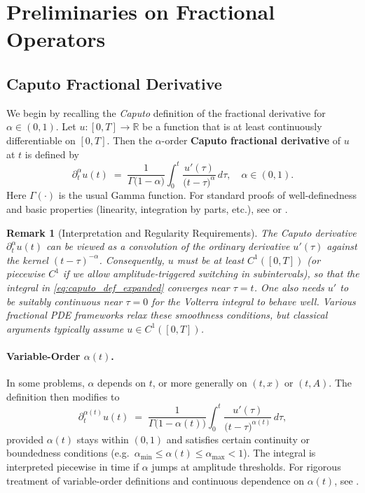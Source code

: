 \documentclass[12pt]{article}
\newtheorem{remark}[theorem]{Remark}
\begin{document}
\section{Preliminaries on Fractional Operators}

\subsection{Caputo Fractional Derivative}
\label{subsec:caputo}

We begin by recalling the \emph{Caputo} definition of the fractional derivative for
\(\alpha\in(0,1)\). Let \(u \colon [0,T]\to \mathbb{R}\) be a function that is at least
continuously differentiable on \([0,T]\). Then the \(\alpha\)-order \textbf{Caputo
fractional derivative} of \(u\) at \(t\) is defined by
\begin{equation}
\label{eq:caputo_def_expanded}
\partial_t^\alpha u(t)
\;=\;
\frac{1}{\Gamma\bigl(1-\alpha\bigr)}
\int_{0}^{t}
  \frac{u'(\tau)}{\bigl(t-\tau\bigr)^{\alpha}}
\,d\tau,
\quad
\alpha\in(0,1).
\end{equation}
Here \(\Gamma(\cdot)\) is the usual Gamma function. For standard proofs of well-definedness
and basic properties (linearity, integration by parts, etc.), see
\cite[Chapter~2]{Diethelm2010} or \cite[Section~2.4]{Kilbas2006}.

\begin{remark}[Interpretation and Regularity Requirements]
The Caputo derivative \(\partial_t^\alpha u(t)\) can be viewed as a \emph{convolution} of
the ordinary derivative \(u'(\tau)\) against the kernel \((t-\tau)^{-\alpha}\). Consequently,
\(u\) must be at least \(C^1([0,T])\) (or piecewise \(C^1\) if we allow amplitude-triggered
switching in subintervals), so that the integral in \eqref{eq:caputo_def_expanded} converges
near \(\tau=t\). One also needs \(u'\) to be suitably continuous near \(\tau=0\) for the
Volterra integral to behave well. Various fractional PDE frameworks relax these smoothness
conditions, but classical arguments typically assume \(u\in C^1([0,T])\).
\end{remark}

\paragraph{Variable-Order \(\alpha(t)\).}
In some problems, \(\alpha\) depends on \(t\), or more generally on \((t,x)\) or \((t,A)\).
The definition then modifies to
\[
\partial_t^{\alpha(t)} u(t)
\;=\;
\frac{1}{\Gamma\bigl(1-\alpha(t)\bigr)}
\int_0^t
  \frac{u'(\tau)}{\bigl(t-\tau\bigr)^{\alpha(t)}}
\,d\tau,
\]
provided \(\alpha(t)\) stays within \((0,1)\) and satisfies certain continuity or boundedness
conditions (e.g.\ \(\alpha_{\min}\le\alpha(t)\le\alpha_{\max}<1\)). The integral is
interpreted piecewise in time if \(\alpha\) jumps at amplitude thresholds. For rigorous
treatment of variable-order definitions and continuous dependence on \(\alpha(t)\), see
\cite{Sun2019}.
\end{document}
